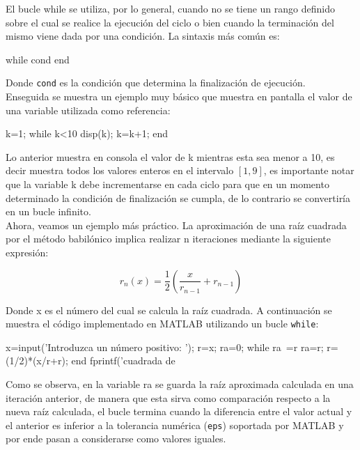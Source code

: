 El bucle while se utiliza, por lo general, cuando no se tiene un rango
definido sobre el cual se realice la ejecución del ciclo o bien cuando
la terminación del mismo viene dada por una condición. La sintaxis más
común es:

\begin{matlab}
while cond
end
\end{matlab}

Donde \texttt{cond} es la condición que determina la finalización de
ejecución. \\

Enseguida se muestra un ejemplo muy básico que muestra en pantalla el
valor de una variable utilizada como referencia:

\begin{matlab}
k=1;
while k<10
    disp(k);
    k=k+1;
end
\end{matlab}

Lo anterior muestra en consola el valor de k mientras esta sea menor a
10, es decir muestra todos los valores enteros en el intervalo
$[1,9]$, es importante notar que la variable k debe
incrementarse en cada ciclo para que en un momento determinado la
condición de finalización se cumpla, de lo contrario se convertiría en
un bucle infinito. \\

Ahora, veamos un ejemplo más práctico. La aproximación de una raíz
cuadrada por el método babilónico implica realizar n iteraciones
mediante la siguiente expresión:

$$ r_n(x) = \frac{1}{2} \left( \frac{x}{r_{n-1}}+r_{n-1} \right) $$

Donde x es el número del cual se calcula la raíz cuadrada. A
continuación se muestra el código implementado en MATLAB utilizando un
bucle \texttt{while}:

\begin{matlab}
x=input('Introduzca un número positivo: ');
r=x;
ra=0;
while ra~=r
    ra=r;
    r=(1/2)*(x/r+r);
end
fprintf(' cuadrada de %
\end{matlab}

Como se observa, en la variable ra se guarda la raíz aproximada
calculada en una iteración anterior, de manera que esta sirva como
comparación respecto a la nueva raíz calculada, el bucle termina cuando
la diferencia entre el valor actual y el anterior es inferior a la
tolerancia numérica (\texttt{eps}) soportada por MATLAB y por ende pasan
a considerarse como valores iguales. \\

